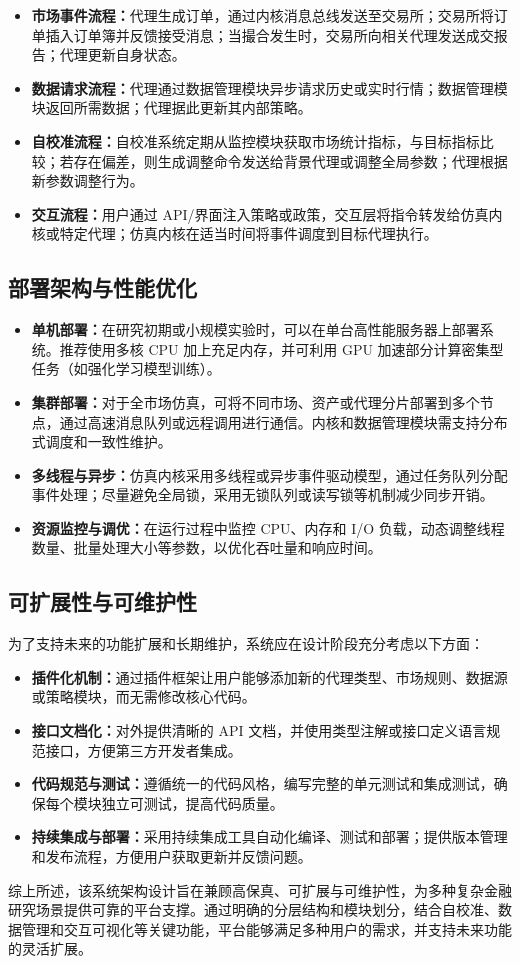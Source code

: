 \begin{itemize}
  \item \textbf{市场事件流程：}代理生成订单，通过内核消息总线发送至交易所；交易所将订单插入订单簿并反馈接受消息；当撮合发生时，交易所向相关代理发送成交报告；代理更新自身状态。
  \item \textbf{数据请求流程：}代理通过数据管理模块异步请求历史或实时行情；数据管理模块返回所需数据；代理据此更新其内部策略。
  \item \textbf{自校准流程：}自校准系统定期从监控模块获取市场统计指标，与目标指标比较；若存在偏差，则生成调整命令发送给背景代理或调整全局参数；代理根据新参数调整行为。
  \item \textbf{交互流程：}用户通过 API/界面注入策略或政策，交互层将指令转发给仿真内核或特定代理；仿真内核在适当时间将事件调度到目标代理执行。
\end{itemize}

\subsection{部署架构与性能优化}

\begin{itemize}
  \item \textbf{单机部署：}在研究初期或小规模实验时，可以在单台高性能服务器上部署系统。推荐使用多核 CPU 加上充足内存，并可利用 GPU 加速部分计算密集型任务（如强化学习模型训练）。
  \item \textbf{集群部署：}对于全市场仿真，可将不同市场、资产或代理分片部署到多个节点，通过高速消息队列或远程调用进行通信。内核和数据管理模块需支持分布式调度和一致性维护。
  \item \textbf{多线程与异步：}仿真内核采用多线程或异步事件驱动模型，通过任务队列分配事件处理；尽量避免全局锁，采用无锁队列或读写锁等机制减少同步开销。
  \item \textbf{资源监控与调优：}在运行过程中监控 CPU、内存和 I/O 负载，动态调整线程数量、批量处理大小等参数，以优化吞吐量和响应时间。
\end{itemize}


\subsection{可扩展性与可维护性}

为了支持未来的功能扩展和长期维护，系统应在设计阶段充分考虑以下方面：

\begin{itemize}
  \item \textbf{插件化机制：}通过插件框架让用户能够添加新的代理类型、市场规则、数据源或策略模块，而无需修改核心代码。
  \item \textbf{接口文档化：}对外提供清晰的 API 文档，并使用类型注解或接口定义语言规范接口，方便第三方开发者集成。
  \item \textbf{代码规范与测试：}遵循统一的代码风格，编写完整的单元测试和集成测试，确保每个模块独立可测试，提高代码质量。
  \item \textbf{持续集成与部署：}采用持续集成工具自动化编译、测试和部署；提供版本管理和发布流程，方便用户获取更新并反馈问题。
\end{itemize}

综上所述，该系统架构设计旨在兼顾高保真、可扩展与可维护性，为多种复杂金融研究场景提供可靠的平台支撑。通过明确的分层结构和模块划分，结合自校准、数据管理和交互可视化等关键功能，平台能够满足多种用户的需求，并支持未来功能的灵活扩展。